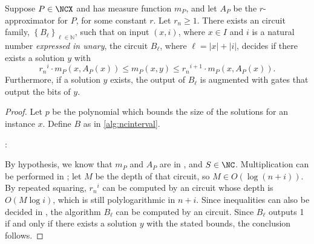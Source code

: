 \documentclass[]{article}
\begin{document}
\begin{lemma}\label{lem:ncinterval}
  Suppose $P \in \NCX$ and has measure function $m_P$, and let $A_P$ be the \FNC{} $r$-approximator for $P$, for some constant $r$.
  Let $r_n \geq 1$.
  There exists an \NNC{} circuit family, $\left\{B_\ell\right\}_{\ell \in \mathbb{N}}$, such that on input $(x, i)$, where $x \in I$ and $i$ is a natural number \emph{expressed in unary}, the circuit $B_\ell$, where $\ell = |x| + |i|$, decides if there exists a solution $y$ with
  \begin{equation*}
    {r_n}^i \cdot m_P(x, A_P(x)) \leq m_P(x, y) \leq {r_n}^{i + 1} \cdot m_P(x, A_P(x)).
  \end{equation*}
  Furthermore, if a solution $y$ exists, the output of $B_\ell$ is augmented with gates that output the bits of $y$.
\end{lemma}
\begin{proof}
  Let $p$ be the polynomial which bounds the size of the solutions for an instance $x$.
  Define $B$ as in \autoref{alg:ncinterval}.
  \begin{algorithm}
    \caption{\NNC{} algorithm that decides if there is an approximate solution for instance $x$ of problem $P$ in interval $i$; here $\ell = |x| + |i|$%
      \label{alg:ncinterval}}
    \begin{algorithmic}[1]
      \Statex{}
      :
        \Else
        \EndIf
      \EndFunction
    \end{algorithmic}
  \end{algorithm}
  By hypothesis, we know that $m_P$ and $A_P$ are in \FNC, and $S \in \NC$.
  Multiplication can be performed in \NC{} \cite{citationneeded}; let $M$ be the depth of that circuit, so $M \in O(\log{(n + i)})$.
  By repeated squaring, ${r_n}^i$ can be computed by an \FNC{} circuit whose depth is $O(M \log i)$, which is still polylogarithmic in $n + i$.
  Since inequalities can also be decided in \NC, the algorithm $B_\ell$ can be computed by an \NC{} circuit.
  Since $B_\ell$ outputs 1 if and only if there exists a solution $y$ with the stated bounds, the conclusion follows.
\end{proof}
\end{document}

